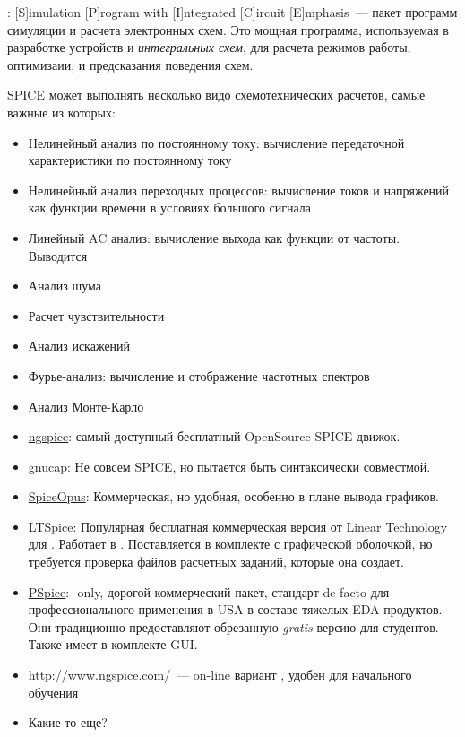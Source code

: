 
\secdown



: [S]imulation [P]rogram with [I]ntegrated [C]ircuit
[E]mphasis\ --- пакет программ симуляции и расчета электронных схем.
Это мощная программа, используемая в разработке устройств и \emph{интегральных
схем}, для расчета режимов работы, оптимизаии, и предсказания поведения схем.

\bigskip
SPICE может выполнять несколько видо схемотехнических расчетов, самые важные
из которых:

\begin{itemize}
  \item
Нелинейный анализ по постоянному току: вычисление передаточной характеристики по
постоянному току
  \item 
Нелинейный анализ переходных процессов: вычисление токов и напряжений как
функции времени в условиях большого сигнала
  \item 
Линейный AC анализ: вычисление выхода как функции от частоты. Выводится
  \item 
Анализ шума 
  \item
Расчет чувствительности
  \item 
Анализ искажений 
  \item
Фурье-анализ: вычисление и отображение частотных спектров   
  \item 
Анализ Монте-Карло
\end{itemize}  


\begin{itemize}
\item \href{http://ngspice.sourceforge.net/}{ngspice}: самый доступный
бесплатный OpenSource SPICE-движок.
\item
\href{https://www.gnu.org/software/gnucap/}{gnucap}:
Не совсем SPICE, но пытается быть синтаксически совместмой.
\item \href{http://www.spiceopus.si/}{SpiceOpus}: Коммерческая, но
удобная, особенно в плане вывода графиков.
\item \href{http://www.linear.com/designtools/software/}{LTSpice}:
Популярная бесплатная коммерческая версия от Linear Technology для \win.
Работает в . Поставляется в комплекте с графической оболочкой,
но требуется проверка файлов расчетных заданий, которые она создает. 
\item
\href{http://www.cadence.com/products/orcad/pspice_simulation/Pages/default.aspx}{PSpice}:
\win-only, дорогой коммерческий пакет, стандарт de-facto для
профессионального применения в USA в составе тяжелых EDA-продуктов.
Они традиционно предоставляют обрезанную \emph{gratis}-версию для студентов.
Также имеет в комплекте GUI.
\item \url{http://www.ngspice.com/}\ --- on-line вариант , удобен
для начального обучения
\item Какие-то еще?
\end{itemize}

